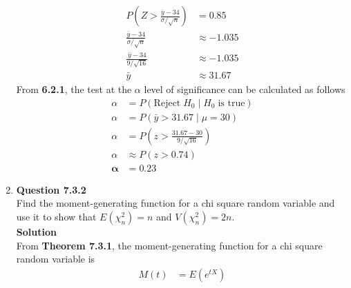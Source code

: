 \documentclass{uofa-eng-assignment}
\begin{document}
\begin{enumerate}
\begin{align*}
            P(Z > \frac{\bar{y} - 34}{\sigma /\sqrt{n}}) & = 0.85                                          \\
            \frac{\bar{y} - 34}{\sigma / \sqrt{n}}       & \approx -1.035                                  \\
            \frac{\bar{y} - 34}{9 / \sqrt{16}}           & \approx -1.035                                  \\
            \bar{y}                                      & \approx 31.67
        \end{align*}
        From \textbf{6.2.1}, the test at the $\alpha$ level of significance can be calculated as follows
        \begin{align*}
            \alpha              & = P(\text{Reject}\;H_0\;|\;H_0\;\text{is true}) \\
            \alpha              & = P(\bar{y} > 31.67\;|\;\mu = 30)               \\
            \alpha              & = P(z > \frac{31.67 - 30}{9 / \sqrt{16}})       \\
            \alpha              & \approx P(z > 0.74)                             \\
            \boldsymbol{\alpha} & \boldsymbol{= 0.23}
        \end{align*}
    \item[]
        \textbf{Question 7.3.2} \\
        Find the moment-generating function for a chi square random variable and use it to show that
        $E(\chi^2_n) = n$ and $V(\chi^2_n) = 2n$. \\
        \textbf{Solution} \\
        From \textbf{Theorem 7.3.1}, the moment-generating function for a chi square random variable is
        \begin{align*}
            M(t) & = E(e^{tX})                                                                            \\

\end{align*}
\end{enumerate}
\end{document}
